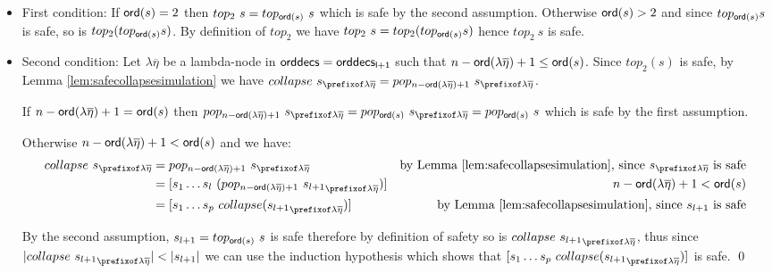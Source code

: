 \documentclass{article}
\theoremstyle{remark}
\theoremstyle{definition}
\newcommand\orddec{\sf orddec}
\begin{document}
\begin{itemize}
\item First condition: If ${\sf ord}(s)=2$ then $top_2~s = top_{{\sf ord}(s)}~s$ which is safe by the second assumption. Otherwise ${\sf ord}(s)>2$ and since $top_{{\sf ord}(s)} s$ is safe, so is $top_2(top_{{\sf ord}(s)} s)$. By definition of $top_2$ we have $top_2~s = top_2(top_{{\sf ord}(s)} s)$ hence $top_2~s$ is safe.

\item Second condition: Let $\lambda \overline{\eta}$ be a lambda-node in $\orddec{s} = \orddec{s_{l+1}}$ such that $n-{\sf ord}(\lambda \overline{\eta})+1 \leq {\sf ord}(s)$.
Since $top_2(s)$ is safe, by Lemma \ref{lem:safecollapsesimulation} we have
$collapse~s_{\prefixof \lambda \overline{\eta}} = pop_{n-\ord{\lambda \overline{\eta}}+1}~s_{\prefixof \lambda \overline{\eta}}$.

If $n-{\sf ord}(\lambda \overline{\eta})+1 = {\sf ord}(s)$ then
$pop_{n-\ord{\lambda \overline{\eta}}+1}~s_{\prefixof \lambda \overline{\eta}} = pop_{\ord{s}}~s_{\prefixof\lambda\overline\eta} = pop_{\ord{s}}~s$ which is safe by the first assumption.

Otherwise $n-{\sf ord}(\lambda \overline{\eta})+1 < {\sf ord}(s)$ and we have:
\begin{align*}
  collapse~s_{\prefixof\lambda\overline\eta}
      &= pop_{n-\ord{\lambda \overline{\eta}}+1}~s_{\prefixof\lambda\overline\eta}
      & \mbox{by Lemma \ref{lem:safecollapsesimulation}, since $s_{\prefixof\lambda\overline\eta}$ is safe} \\
  &= [ s_1 \ldots s_l\ (pop_{n-\ord{\lambda\overline\eta}+1}~ {s_{l+1}}_{\prefixof\lambda\overline\eta}) ]
   & \mbox{$n-\ord{\lambda \overline{\eta}}+1<\ord{s}$}  \\
  &= [s_1 \ldots s_p~collapse({s_{l+1}}_{\prefixof\lambda\overline\eta}) ]
  & \mbox{by Lemma \ref{lem:safecollapsesimulation}, since $s_{l+1}$ is safe}
\end{align*}

By the second assumption, $s_{l+1} = top_{{\sf ord}(s)}~s$ is safe therefore by definition
of safety so is $collapse~{s_{l+1}}_{\prefixof\lambda\overline\eta}$, thus
since $|collapse~{s_{l+1}}_{\prefixof\lambda\overline\eta}| < |s_{l+1}|$ we can use the induction hypothesis which shows that $[s_1 \ldots s_p~collapse({s_{l+1}}_{\prefixof\lambda\overline\eta}) ]$ is safe.
\qed
\end{itemize}
\end{document}
